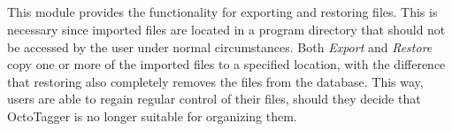 \subsection{}
\def\kapitelautor{Erik Ritschl}

This module provides the functionality for exporting and restoring files. This is necessary since imported files are located in a program directory that should not be accessed by the user under normal circumstances. Both \emph{Export} and \emph{Restore} copy one or more of the imported files to a specified location, with the difference that restoring also completely removes the files from the database. This way, users are able to regain regular control of their files, should they decide that OctoTagger is no longer suitable for organizing them.

